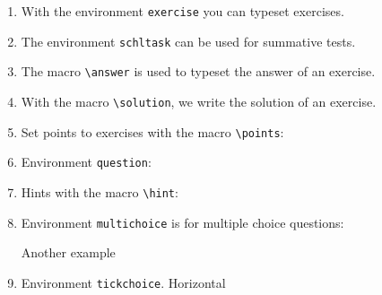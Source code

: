 \documentclass[10pt,a4page]{article}
\def\cellwidth{0.4\textwidth}
\newcommand{\miniexample}[3][t]{%
  \parbox[#1][#3][t]{\cellwidth}{#2}
}
\newcommand{\codeexample}[3][c]{%
  \colorbox[HTML]{b0c4be}{\miniexample[#1]{}{#3}}
}
\newcommand{\textexample}[3][c]{%
  {\footnotesize
    \colorbox[gray]{0.9}{\miniexample[#1]{}{#3}}%
  }
}
\newcommand{\examplerow}[3][10pt]{%
  \par\noindent\strut\hfill\codeexample{#2}{#3}\hspace{#1}\textexample{#2}{#3}\hfill\strut
}
\newlength{\exheight}
\begin{document}
\begin{enumerate}
\item With the environment \texttt{exercise} you can typeset exercises.
  \setlength{\exheight}{132pt}
  \examplerow{exampleEnvirExercise.tex}{\exheight}
\item The environment \texttt{schltask} can be used for summative tests.
  \setlength{\exheight}{57pt}
  \examplerow{exampleEnvirSchltask.tex}{\exheight}
\item The macro \verb/\answer/ is used to typeset the answer of an exercise.
  \setlength{\exheight}{38pt}
  \examplerow{exampleMacroAnswer.tex}{\exheight}
\item With the macro \verb|\solution|, we write the solution of an exercise.
  \setlength{\exheight}{56pt}
  \examplerow{exampleMacroSolution.tex}{\exheight}
\item Set points to exercises with the macro \verb|\points|:
  \setlength{\exheight}{113pt}
  \examplerow{exampleMacroPoints.tex}{\exheight}
\item Environment \verb|question|:
  \setlength{\exheight}{38pt}
  \examplerow{exampleEnvirQuestion.tex}{\exheight}
\item Hints with the macro \verb|\hint|:
  \setlength{\exheight}{123pt}
  \examplerow{exampleMacroHint.tex}{\exheight}
\item Environment \verb|multichoice| is for multiple choice questions:
  \setlength{\exheight}{48pt}
  \examplerow{exampleEnvirMultichoice01.tex}{\exheight}

  Another example
  \setlength{\exheight}{57pt}
  \examplerow{exampleEnvirMultichoice02.tex}{\exheight}
\item Environment \texttt{tickchoice}. Horizontal
  \setlength{\exheight}{48pt}
  \examplerow{exampleEnvirTickchoice01.tex}{\exheight}


\end{enumerate}
\end{document}
